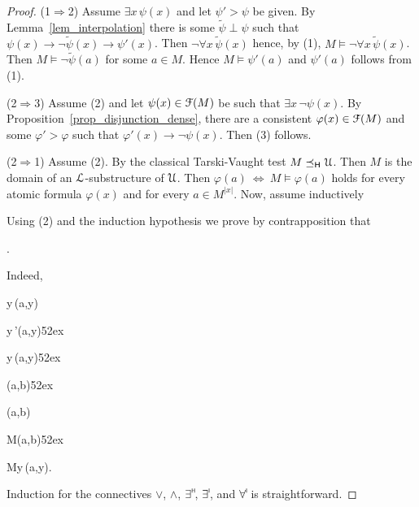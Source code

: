 \documentclass[10pt,oneside]{amsproc}
\def\forallH{\forall}
\def\existsH{\exists}
\begin{document}
\begin{proof}
  (1$\Rightarrow$2) Assume $\existsH x\,\psi(x)$ and let $\psi'>\psi$ be given.
  By Lemma~\ref{lem_interpolation} there is some $\tilde{\psi}\perp\psi$ such that  $\psi(x)\rightarrow\neg\tilde{\psi}(x)\rightarrow\psi'(x)$.
  Then $\neg\forallH x\,\tilde{\psi}(x)$ hence, by (1), $M\models\neg\forallH x\,\tilde{\psi}(x)$.
  Then $M\models\neg\tilde{\psi}(a)$ for some $a\in M$. Hence $M\models\psi'(a)$ and $\psi'(a)$ follows from (1).

  (2$\Rightarrow$3)
  Assume (2) and let $\psi(x)\in{\EuScript F}(M)$ be such that $\existsH x\,\neg\psi(x)$.
  By Proposition~\ref{prop_disjunction_dense}, there are a consistent $\varphi(x)\in{\EuScript F}(M)$ and some $\varphi'>\varphi$ such that $\varphi'(x)\rightarrow\neg\psi(x)$.
  Then (3) follows.

  (2$\Rightarrow$1)
  Assume (2).
  By the classical Tarski-Vaught test $M\preceq_{\sf H}{\EuScript U}$.
  Then $M$ is the domain of an ${\EuScript L}$-substructure of ${\EuScript U}$.
  Then $\varphi(a)\ \Leftrightarrow\ M\models\varphi(a)$ holds for every atomic formula $\varphi(x)$ and for every $a\in M^{|x|}$.
  Now, assume inductively
  

  Using (2) and the induction hypothesis we prove by contrapposition that

  \ceq{\hfill M\models\forallH y\,\varphi(a,y)}{\Rightarrow}{\forallH y\,\varphi(a,y)}.

  Indeed,

  \ceq{\hfill\neg\forallH y\,\varphi(a,y)}
  {\Rightarrow}{\existsH y\,\neg\varphi(a,y)}
  
  \ceq{}
  {\Rightarrow}{\existsH y\,\neg\varphi'(a,y)}\hfill {}\kern52ex
  
  \ceq{}
  {\Rightarrow}{\existsH y\,\neg\psi(a,y)}\hfill{}\kern52ex%
  
  \ceq{}
  {\Rightarrow}
  {\neg\psi(a,b)}\hfill{}\kern52ex
  
  \ceq{}
  {\Rightarrow}
  {\neg\varphi(a,b)}
  
  \ceq{}
  {\Rightarrow}
  {M\models\neg\varphi(a,b)}\hfill{}\kern52ex

  \ceq{}
  {\Rightarrow}
  {M\not\models\forallH y\,\varphi(a,y).}

  Induction for the connectives $\vee$, $\wedge$, $\exists\raisebox{1.1ex}{\scaleto{\sf H}{.8ex}\kern-.2ex}$, $\exists\raisebox{1.1ex}{\scaleto{\sf I}{.8ex}\kern-.2ex}$, and $\forall\raisebox{1.1ex}{\scaleto{\sf I}{.8ex}\kern-.2ex}$ is straightforward.
\end{proof}
\end{document}
